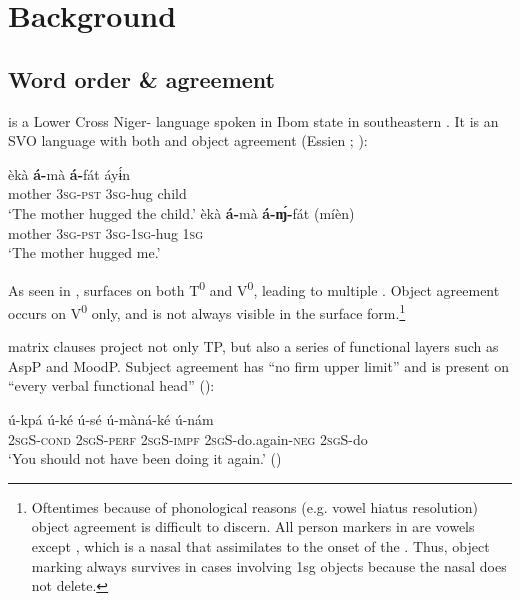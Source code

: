 \documentclass[output=paper,
modfonts
]{langscibook}
\begin{document}
\section{Background}\label{sec:duncan:2}
\subsection{Word order \& agreement}

 is a Lower Cross Niger- language spoken in  Ibom state in southeastern . It is an SVO language with both  and object agreement (Essien \citeyear*{Essien1990grammar}; \citealt{BakerWillie2010}):

\ea \label{ex:duncan:3}
\ea 
\gll èkà \textbf{á-}mà \textbf{á-}fát áy\'ɨn\\
 mother 3\textsc{sg-pst} 3\textsc{sg}-hug child\\
\glt ‘The mother hugged the child.’
\ex
\gll èkà \textbf{á-}mà \textbf{á-\'ɱ-}fát (míèn)\\
 mother 3\textsc{sg-pst} \textsc{3sg-1sg}-hug 1\textsc{sg}\\
\glt ‘The mother hugged me.’
\z
\z


\noindent As seen in ,  surfaces on both T\textsuperscript{0} and V\textsuperscript{0}, leading to multiple . Object agreement occurs on V\textsuperscript{0} only, and is not always visible in the surface form.\footnote{Oftentimes because of phonological reasons (e.g. vowel hiatus resolution) object agreement is difficult to discern. All person markers in  are vowels except , which is a nasal that assimilates to the onset of the  . Thus, object marking always survives in cases involving 1sg objects because the nasal does not delete.}

 matrix clauses project not only TP, but also a series of functional layers such as AspP and MoodP. Subject agreement has “no firm upper limit” and is present on “every verbal functional head” (\citealt[110]{BakerWillie2010}):

\ea \label{ex:duncan:4}
\gll ú-kpá ú-ké ú-sé ú-màná-ké ú-nám\\
2\textsc{sgS-cond} \textsc{2sgS-perf} \textsc{2sgS-impf} \textsc{2sgS}-do.again-\textsc{neg} 2\textsc{sgS}-do\\
\glt ‘You should not have been doing it again.’ (\citealt[118]{BakerWillie2010})
\z
\end{document}
